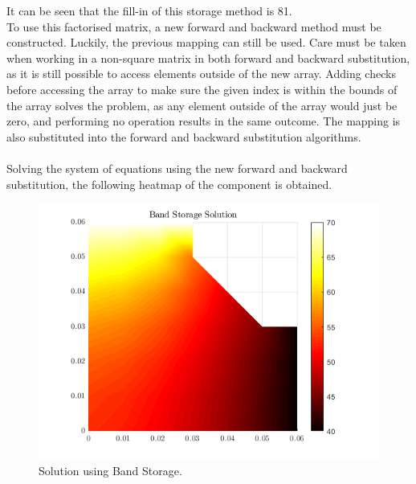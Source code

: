 \documentclass[12pt,a4paper]{article}
\begin{document}
It can be seen that the fill-in of this storage method is 81.\\To use this factorised matrix, a new forward and backward method must be constructed. Luckily, the previous mapping can still be used. Care must be taken when working in a non-square matrix in both forward and backward substitution, as it is still possible to access elements outside of the new array. Adding checks before accessing the array to make sure the given index is within the bounds of the array solves the problem, as any element outside of the array would just be zero, and performing no operation results in the same outcome. The mapping is also substituted into the forward and backward substitution algorithms.\\\\Solving the system of equations using the new forward and backward substitution, the following heatmap of the component is obtained.
\begin{figure}[H]
	\includegraphics[width=\linewidth]{images/bandsolution.png}
	\caption{Solution using Band Storage.}
	\label{fig:bandsolution}
\end{figure}
\end{document}
